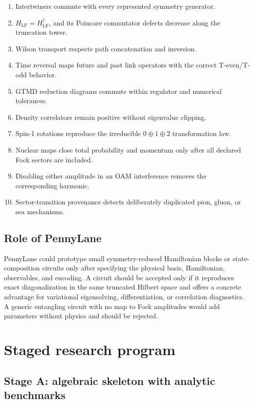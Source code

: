 \documentclass[11pt]{article}
\newcommand{\LF}{\mathrm{LF}}
\begin{document}
\begin{enumerate}
\item Intertwiners commute with every represented symmetry generator.
\item \(H_{\LF}=H_{\LF}^\dagger\), and its Poincare commutator defects decrease
along the truncation tower.
\item Wilson transport respects path concatenation and inversion.
\item Time reversal maps future and past link operators with the correct
T-even/T-odd behavior.
\item GTMD reduction diagrams commute within regulator and numerical
tolerances.
\item Density correlators remain positive without eigenvalue clipping.
\item Spin-1 rotations reproduce the irreducible \(0\oplus1\oplus2\)
transformation law.
\item Nuclear maps close total probability and momentum only after all
declared Fock sectors are included.
\item Disabling either amplitude in an OAM interference removes the
corresponding harmonic.
\item Sector-transition provenance detects deliberately duplicated pion,
gluon, or sea mechanisms.
\end{enumerate}

\subsection{Role of PennyLane}

PennyLane could prototype small symmetry-reduced Hamiltonian blocks or
state-composition circuits only after specifying the physical basis,
Hamiltonian, observables, and encoding.  A circuit should be accepted only
if it reproduces exact diagonalization in the same truncated Hilbert space
and offers a concrete advantage for variational eigensolving, differentiation,
or correlation diagnostics.  A generic entangling circuit with no map to
Fock amplitudes would add parameters without physics and should be rejected.

\section{Staged research program}

\subsection{Stage A: algebraic skeleton with analytic benchmarks}
\end{document}
